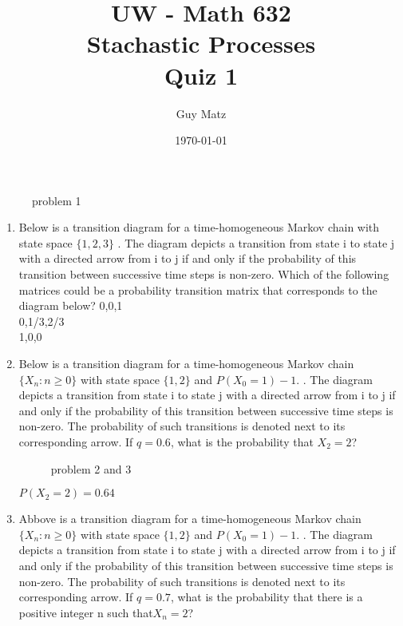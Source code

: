 \documentclass[10pt]{article}
\title{UW - Math 632 \\
Stachastic Processes \\
Quiz 1}
\author{Guy Matz}
\date{\today}
\begin{document}
    \begin{figure}
      \caption{problem 1}
    \end{figure}

\begin{enumerate}
  \item Below is a transition diagram for a time-homogeneous Markov
    chain with state space $\{1,2,3\}$
. The diagram depicts a transition from state i to state j with a directed arrow from i to j if and only if the probability of this transition between successive time steps is non-zero. Which of the following matrices could be a probability transition matrix that corresponds to the diagram below?
  0,0,1 \\
  0,1/3,2/3 \\
  1,0,0

  \item Below is a transition diagram for a time-homogeneous Markov
    chain $\{X_n : n \geq 0 \}$ with state space $\{1,2\}$ and 
    $P(X_0=1)-1$.  . The diagram depicts a transition from state i to
    state j with a directed arrow from i to j if and only if the
    probability of this transition between successive time steps is
    non-zero. The probability of such transitions is denoted next to its
    corresponding arrow. If $q = 0.6$, what is the probability that 
    $X_2 = 2$?
    \begin{figure}
      \caption{problem 2 and 3}
    \end{figure}
    $P(X_2=2) = 0.64$

  \item Abbove is a transition diagram for a time-homogeneous Markov
    chain $\{X_n : n \geq 0 \}$ with state space $\{1,2\}$ and 
    $P(X_0=1)-1$.  . The diagram depicts a transition from state i to
    state j with a directed arrow from i to j if and only if the
    probability of this transition between successive time steps is
    non-zero. The probability of such transitions is denoted next to its
    corresponding arrow. If $q = 0.7$, what is the probability that 
    there is a positive integer n such that$X_n = 2$?


\end{enumerate}
\end{document}
